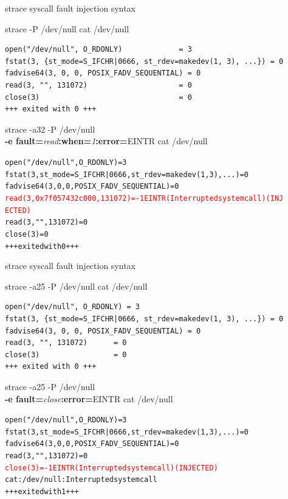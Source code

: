\documentclass[unicode]{beamer}
\begin{document}
\begin{frame}[fragile]{strace syscall fault injection syntax}
\scriptsize
\begin{block}{\large strace -P /dev/null cat /dev/null}
\begin{verbatim}
open("/dev/null", O_RDONLY)             = 3
fstat(3, {st_mode=S_IFCHR|0666, st_rdev=makedev(1, 3), ...}) = 0
fadvise64(3, 0, 0, POSIX_FADV_SEQUENTIAL) = 0
read(3, "", 131072)                     = 0
close(3)                                = 0
+++ exited with 0 +++
\end{verbatim}
\end{block}
\begin{block}{\large strace -a32 -P /dev/null \\ {\bf -e fault=}{\it read}{\bf :when=}{\it 1}{\bf :error=}{\sc EINTR} cat /dev/null}
\begin{alltt}
open("/dev/null", O_RDONLY)             = 3
fstat(3, {st_mode=S_IFCHR|0666, st_rdev=makedev(1, 3), ...}) = 0
fadvise64(3, 0, 0, POSIX_FADV_SEQUENTIAL) = 0
\textcolor{red}{read(3, 0x7f057432c000, 131072) = -1 EINTR (Interrupted system call) (INJ
ECTED)}
read(3, "", 131072)                     = 0
close(3)                                = 0
+++ exited with 0 +++
\end{alltt}
\end{block}
\end{frame}

\begin{frame}[fragile]{strace syscall fault injection syntax}
\scriptsize
\begin{block}{\large strace -a25 -P /dev/null cat /dev/null}
\begin{verbatim}
open("/dev/null", O_RDONLY) = 3
fstat(3, {st_mode=S_IFCHR|0666, st_rdev=makedev(1, 3), ...}) = 0
fadvise64(3, 0, 0, POSIX_FADV_SEQUENTIAL) = 0
read(3, "", 131072)      = 0
close(3)                 = 0
+++ exited with 0 +++
\end{verbatim}
\end{block}
\begin{block}{\large strace -a25 -P /dev/null \\ {\bf -e fault=}{\it close}{\bf :error=}{\sc EINTR} cat /dev/null}
\begin{alltt}
open("/dev/null", O_RDONLY) = 3
fstat(3, {st_mode=S_IFCHR|0666, st_rdev=makedev(1, 3), ...}) = 0
fadvise64(3, 0, 0, POSIX_FADV_SEQUENTIAL) = 0
read(3, "", 131072)      = 0
\textcolor{red}{close(3)                 = -1 EINTR (Interrupted system call) (INJECTED)}
cat: /dev/null: Interrupted system call
+++ exited with 1 +++
\end{alltt}
\end{block}
\end{frame}
\end{document}
